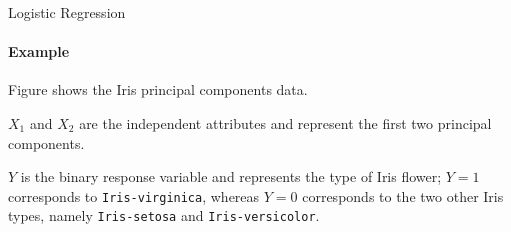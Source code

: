\begin{frame}{Logistic Regression}
\framesubtitle{Example}
Figure shows the Iris principal components data. 

\medskip

$X_1$ and $X_2$ are the independent attributes and represent the first two
principal components. 

\medskip

$Y$ is the binary response variable and represents the type of Iris flower; $Y=1$ corresponds to {\tt Iris-virginica}, whereas $Y=0$ corresponds to the two other Iris types, namely {\tt Iris-setosa} and {\tt Iris-versicolor}.
\vspace*{1.5cm}

\def\PsEuler{2.71828182846}
\centerline{
    }%
\end{frame}

